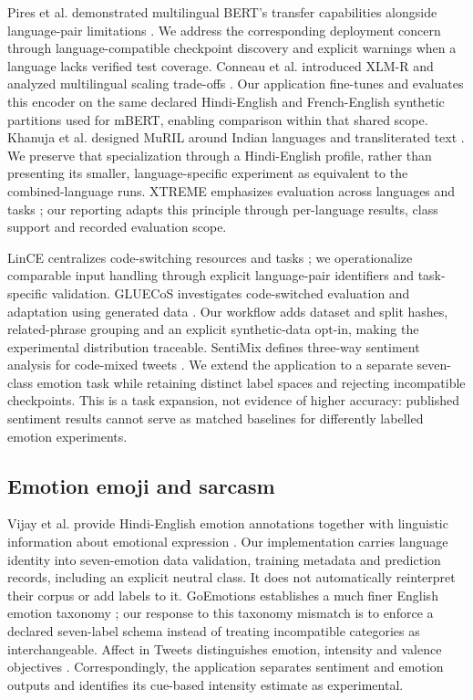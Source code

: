 \documentclass[conference]{IEEEtran}
\begin{document}
Pires et al. demonstrated multilingual BERT's transfer capabilities alongside language-pair limitations \cite{pires2019}. We address the corresponding deployment concern through language-compatible checkpoint discovery and explicit warnings when a language lacks verified test coverage. Conneau et al. introduced XLM-R and analyzed multilingual scaling trade-offs \cite{conneau2020}. Our application fine-tunes and evaluates this encoder on the same declared Hindi-English and French-English synthetic partitions used for mBERT, enabling comparison within that shared scope. Khanuja et al. designed MuRIL around Indian languages and transliterated text \cite{khanuja2021}. We preserve that specialization through a Hindi-English profile, rather than presenting its smaller, language-specific experiment as equivalent to the combined-language runs. XTREME emphasizes evaluation across languages and tasks \cite{hu2020}; our reporting adapts this principle through per-language results, class support and recorded evaluation scope.

LinCE centralizes code-switching resources and tasks \cite{aguilar2020}; we operationalize comparable input handling through explicit language-pair identifiers and task-specific validation. GLUECoS investigates code-switched evaluation and adaptation using generated data \cite{khanuja2020}. Our workflow adds dataset and split hashes, related-phrase grouping and an explicit synthetic-data opt-in, making the experimental distribution traceable. SentiMix defines three-way sentiment analysis for code-mixed tweets \cite{patwa2020}. We extend the application to a separate seven-class emotion task while retaining distinct label spaces and rejecting incompatible checkpoints. This is a task expansion, not evidence of higher accuracy: published sentiment results cannot serve as matched baselines for differently labelled emotion experiments.

\subsection{Emotion emoji and sarcasm}

Vijay et al. provide Hindi-English emotion annotations together with linguistic information about emotional expression \cite{vijay2018}. Our implementation carries language identity into seven-emotion data validation, training metadata and prediction records, including an explicit neutral class. It does not automatically reinterpret their corpus or add labels to it. GoEmotions establishes a much finer English emotion taxonomy \cite{demszky2020}; our response to this taxonomy mismatch is to enforce a declared seven-label schema instead of treating incompatible categories as interchangeable. Affect in Tweets distinguishes emotion, intensity and valence objectives \cite{mohammad2018}. Correspondingly, the application separates sentiment and emotion outputs and identifies its cue-based intensity estimate as experimental.
\end{document}
